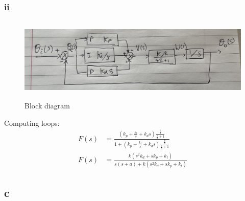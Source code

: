 \documentclass[11pt]{article}
\numberwithin{equation}{section}
\begin{document}
\subsubsection{ii}
\begin{figure}[H]
    \centering
    \includegraphics[height = 4cm]{./img/q1bii.jpg}
    \caption{Block diagram}
    \label{fig:q1bii}
\end{figure}
Computing loops:
\begin{align}
    F(s) &= \frac{\left(k_p + \frac{k_t}{s} + k_d s\right)\frac{\frac{k}{a}}{\frac{s}{a}+ 1}}{1 + \left(k_p + \frac{k_t}{s} + k_d s\right)\frac{\frac{k}{a}}{\frac{s}{a}+ 1}}\\
    F(s) &= \frac{k\left(s^2 k_d + sk_p + k_t\right)}{s\left(s+a\right)+k\left(s^2 k_d + sk_p + k_t\right)}
\end{align}
\subsection{c}
\end{document}
